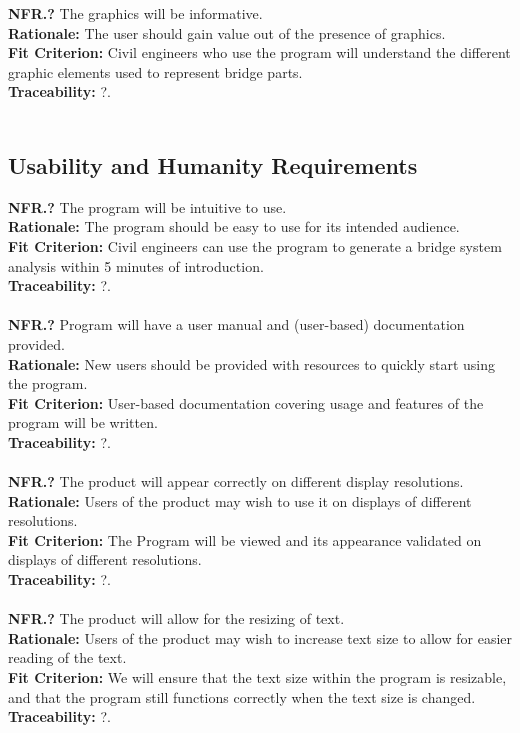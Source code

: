 \documentclass[12pt]{article}
\begin{document}
  \textbf{NFR.?} The graphics will be informative.\\
  \textbf{Rationale:} The user should gain value out of the presence of graphics.\\
  \textbf{Fit Criterion:} Civil engineers who use the program will understand the different graphic elements used to represent bridge parts.\\
  \textbf{Traceability:} ?.\\\\

\subsection{Usability and Humanity Requirements}

  \textbf{NFR.?} The program will be intuitive to use.\\
  \textbf{Rationale:} The program should be easy to use for its intended audience.\\
  \textbf{Fit Criterion:} Civil engineers can use the program to generate a bridge system analysis within 5 minutes of introduction.\\
  \textbf{Traceability:} ?.\\\\

  \textbf{NFR.?} Program will have a user manual and (user-based) documentation provided.\\
  \textbf{Rationale:} New users should be provided with resources to quickly start using the program.\\
  \textbf{Fit Criterion:} User-based documentation covering usage and features of the program will be written.\\
  \textbf{Traceability:} ?.\\\\

  \textbf{NFR.?} The product will appear correctly on different display resolutions.\\
  \textbf{Rationale:} Users of the product may wish to use it on displays of different resolutions.\\
  \textbf{Fit Criterion:} The Program will be viewed and its appearance validated on displays of different resolutions.\\
  \textbf{Traceability:} ?.\\\\

  \textbf{NFR.?} The product will allow for the resizing of text.\\
  \textbf{Rationale:} Users of the product may wish to increase text size to allow for easier reading of the text.\\
  \textbf{Fit Criterion:} We will ensure that the text size within the program is resizable, and that the program still functions correctly when the text size is changed.\\
  \textbf{Traceability:} ?.\\\\
\end{document}

